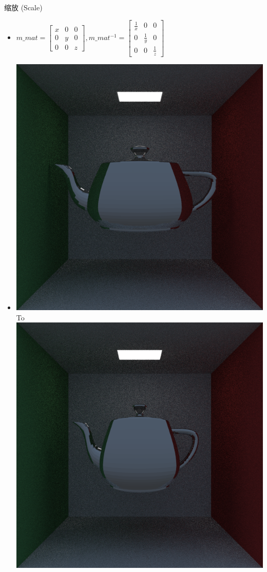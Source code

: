 \documentclass{beamer}
\begin{document}
\begin{frame} {缩放 (Scale)}
\begin{itemize}
\item $m\_mat = \begin{bmatrix} x&0&0\\ 0&y&0\\ 0&0&z \end{bmatrix} ,m\_mat^{-1} = \begin{bmatrix} \frac{1}{x}&0&0\\ 0&\frac{1}{y}&0\\ 0&0&\frac{1}{z} \end{bmatrix}$
\item \includegraphics[scale=0.2]{cornellbox_teapot_translate} To 
\includegraphics[scale=0.2]{cornellbox_teapot_scale}
\end{itemize}
\end{frame}
\end{document}
